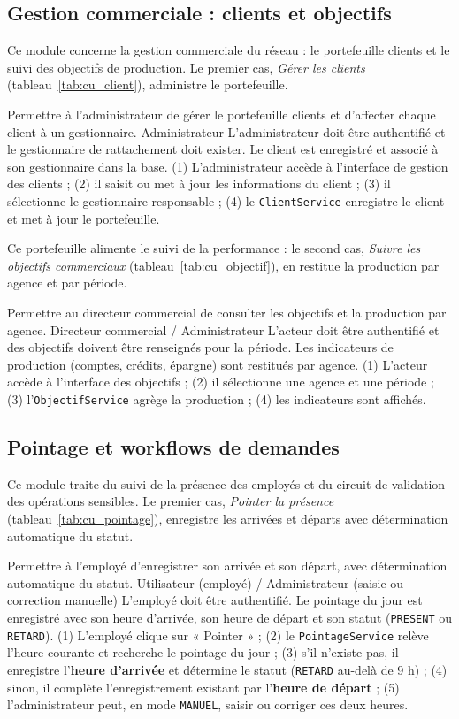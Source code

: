 \subsection{Gestion commerciale : clients et objectifs}
Ce module concerne la gestion commerciale du réseau : le portefeuille clients et le
suivi des objectifs de production. Le premier cas, \emph{Gérer les clients}
(tableau~\ref{tab:cu_client}), administre le portefeuille.

{Permettre à l'administrateur de gérer le portefeuille clients et d'affecter
chaque client à un gestionnaire.}
{Administrateur}
{L'administrateur doit être authentifié et le gestionnaire de rattachement doit
exister.}
{Le client est enregistré et associé à son gestionnaire dans la base.}
{(1) L'administrateur accède à l'interface de gestion des clients ; (2) il saisit
ou met à jour les informations du client ; (3) il sélectionne le gestionnaire
responsable ; (4) le \texttt{ClientService} enregistre le client et met à jour le
portefeuille.}

Ce portefeuille alimente le suivi de la performance : le second cas, \emph{Suivre
les objectifs commerciaux} (tableau~\ref{tab:cu_objectif}), en restitue la
production par agence et par période.

{Permettre au directeur commercial de consulter les objectifs et la production par
agence.}
{Directeur commercial / Administrateur}
{L'acteur doit être authentifié et des objectifs doivent être renseignés pour la
période.}
{Les indicateurs de production (comptes, crédits, épargne) sont restitués par
agence.}
{(1) L'acteur accède à l'interface des objectifs ; (2) il sélectionne une agence
et une période ; (3) l'\texttt{ObjectifService} agrège la production ; (4) les
indicateurs sont affichés.}

\subsection{Pointage et workflows de demandes}
Ce module traite du suivi de la présence des employés et du circuit de validation
des opérations sensibles. Le premier cas, \emph{Pointer la présence}
(tableau~\ref{tab:cu_pointage}), enregistre les arrivées et départs avec
détermination automatique du statut.

{Permettre à l'employé d'enregistrer son arrivée et son départ, avec
détermination automatique du statut.}
{Utilisateur (employé) / Administrateur (saisie ou correction manuelle)}
{L'employé doit être authentifié.}
{Le pointage du jour est enregistré avec son heure d'arrivée, son heure de départ
et son statut (\texttt{PRESENT} ou \texttt{RETARD}).}
{(1) L'employé clique sur « Pointer » ; (2) le \texttt{PointageService} relève
l'heure courante et recherche le pointage du jour ; (3) s'il n'existe pas, il
enregistre l'\textbf{heure d'arrivée} et détermine le statut (\texttt{RETARD}
au-delà de 9 h) ; (4) sinon, il complète l'enregistrement existant par
l'\textbf{heure de départ} ; (5) l'administrateur peut, en mode
\texttt{MANUEL}, saisir ou corriger ces deux heures.}

